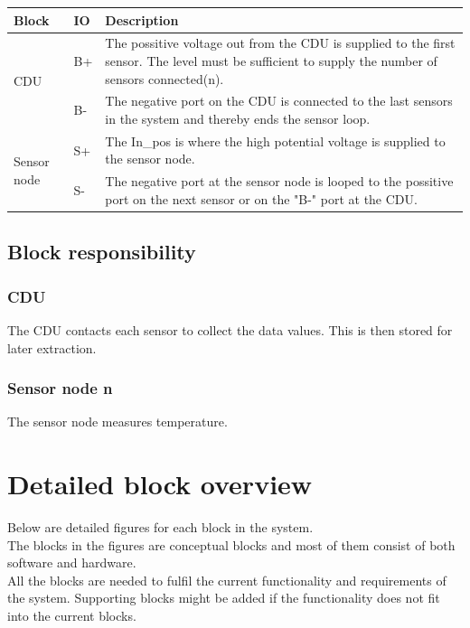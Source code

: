 \begin{table}[H]
\begin{center}
\begin{tabular}{|p{2.5cm}|p{1cm}| p{9cm}| }
\hline
\textbf{Block} & \textbf{IO} & \textbf{Description} \\\hline
\multirow{2}{2.5cm}[-2em]{CDU} & B+& The possitive voltage out from the CDU is supplied to the first sensor. The level must be sufficient to supply the number of sensors connected(n).\\ \cline{2-3}
 & B-  & The negative port on the CDU is connected to the last sensors in the system and thereby ends the sensor loop. \\ \hline
\multirow{2}{2.5cm}[-2em]{Sensor node} & S+ &The In\_pos is where the high potential voltage is supplied to the sensor node. \\ \cline{2-3}
& S- & The negative port at the sensor node is looped to the possitive port on the next sensor or on the "B-" port at the CDU. \\ \hline
\end{tabular}
\end{center}
\end{table}

\subsection{Block responsibility}
\subsubsection{CDU}
The CDU contacts each sensor to collect the data values. This is then stored for later extraction.

\subsubsection{Sensor node n}
The sensor node measures temperature.

\section{Detailed block overview}
Below are detailed figures for each block in the system.\\
The blocks in the figures are conceptual blocks and most of them consist of both software and hardware.\\
All the blocks are needed to fulfil the current functionality and requirements of the system. Supporting blocks might be added if the functionality does not fit into the current blocks.

